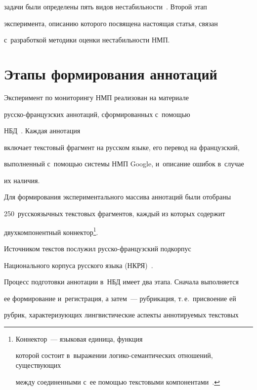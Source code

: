 задачи были определены пять видов нестабильности~\cite{3-eg}. Второй этап 


эксперимента, описанию которого посвящена настоящая статья, связан 


с~разработкой методики оценки нестабильности НМП.





\section{Этапы формирования аннотаций}





  Эксперимент по мониторингу НМП реализован на материале  


рус\-ско-фран\-цуз\-ских аннотаций, сформированных с~по\-мощью 


НБД~\cite{11-eg, 12-eg}. Каждая аннотация 


включает текстовый фрагмент на русском языке, его перевод на французский, 


выполненный с~помощью системы НМП Google, и~описание ошибок в~случае 


их наличия.


  


  Для формирования экспериментального массива аннотаций были отобраны 


250~русскоязычных текстовых фрагментов, каждый из которых содержит 


двухкомпонентный коннектор\footnote{Коннектор~--- языковая единица, функция 


которой состоит в~выражении ло\-ги\-ко-се\-ман\-ти\-че\-ских отношений, существующих 


между соединенными с~ее помощью текстовыми компонентами~\cite[с.~17]{13-eg}.}. 


Источником текстов послужил рус\-ско-фран\-цуз\-ский подкорпус 


Национального корпуса русского языка (НКРЯ)~\cite{14-eg}.


  


  Процесс подготовки аннотации в~НБД имеет два этапа. Сначала выполняется 


ее формирование и~регистрация, а затем~--- рубрикация, т.\,е.\ присвоение ей 


рубрик, характеризующих лингвистические аспекты аннотируемых текстовых 


